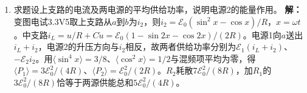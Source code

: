 \documentclass[UTF8,fontset=fandol,a4paper,11pt]{ctexart}
\begin{document}
\begin{enumerate}
\item 求题设上支路的电流及两电源的平均供给功率，说明电源2的能量作用。
\textbf{解：}变图电试3.3V5取上支路从$a$到$b$为$i_2$，则$i_2=\mathcal E_0(\sin^2x-\cos x)/R$，$x=\omega t$。中支路$i_L=u/R+C\dot u=\mathcal E_0(1-\sin2x-\cos2x)/(2R)$。电源1向$a$送出$i_L+i_2$，电源2的升压方向与$i_2$相反，故两者供给功率分别为$\mathcal E_1(i_L+i_2)$、$-\mathcal E_2i_2$。用$\langle\sin^4x\rangle=3/8$、$\langle\cos^2x\rangle=1/2$与混频项平均为零，得$\langle P_1\rangle=3\mathcal E_0^2/(4R)$、$\langle P_2\rangle=\mathcal E_0^2/(2R)$。$R_2$耗散$7\mathcal E_0^2/(8R)$，加$R_1$的$3\mathcal E_0^2/(8R)$恰等于两源供能总和$5\mathcal E_0^2/(4R)$。
\begin{center}\begin{minipage}{.98\linewidth}\centering
{}
\end{minipage}
\end{center}
\end{enumerate}
\end{document}
